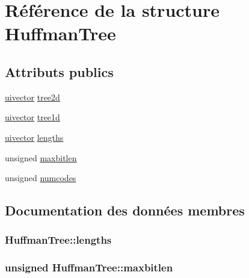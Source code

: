 \hypertarget{struct_huffman_tree}{}\section{Référence de la structure Huffman\+Tree}
\label{struct_huffman_tree}
\subsection*{Attributs publics}
\begin{DoxyCompactItemize}
\item 
\hyperlink{structuivector}{uivector} \hyperlink{struct_huffman_tree_a24afa4a1079f6ee1c9829b9b5aa5fe89}{tree2d}
\item 
\hyperlink{structuivector}{uivector} \hyperlink{struct_huffman_tree_a0bb5fd80eb9ec029f66cf30641b98363}{tree1d}
\item 
\hyperlink{structuivector}{uivector} \hyperlink{struct_huffman_tree_a293790e0f67d8fdf9df5a2914af39251}{lengths}
\item 
unsigned \hyperlink{struct_huffman_tree_adf034ca9ce62a4ebfffaaeaba4378a26}{maxbitlen}
\item 
unsigned \hyperlink{struct_huffman_tree_a608df5a24f60d1077a5cde19d5149e1f}{numcodes}
\end{DoxyCompactItemize}


\subsection{Documentation des données membres}
\hypertarget{struct_huffman_tree_a293790e0f67d8fdf9df5a2914af39251}{}
\subsubsection[{lengths}]{ Huffman\+Tree\+::lengths}\label{struct_huffman_tree_a293790e0f67d8fdf9df5a2914af39251}
\hypertarget{struct_huffman_tree_adf034ca9ce62a4ebfffaaeaba4378a26}{}
\subsubsection[{maxbitlen}]{\setlength{\rightskip}{0pt plus 5cm}unsigned Huffman\+Tree\+::maxbitlen}\label{struct_huffman_tree_adf034ca9ce62a4ebfffaaeaba4378a26}
\hypertarget{struct_huffman_tree_a608df5a24f60d1077a5cde19d5149e1f}{}
